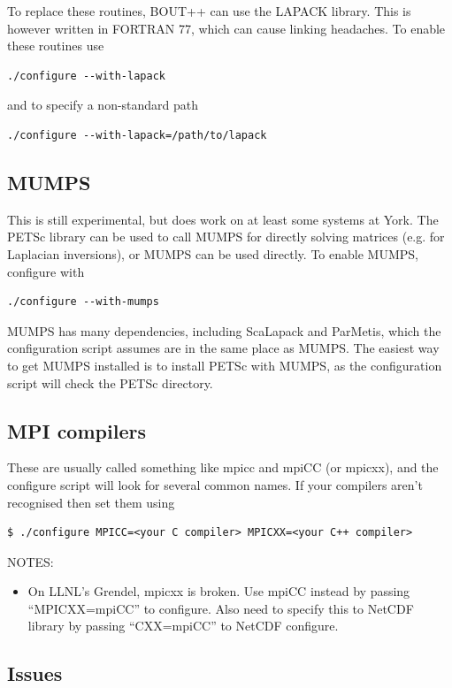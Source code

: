 \documentclass[12pt]{article}
\begin{document}
To replace these routines, BOUT++ can use the LAPACK library. This is however
written in FORTRAN 77, which can cause linking headaches.  To enable these
routines use
%
\begin{verbatim}
./configure --with-lapack
\end{verbatim}
%
and to specify a non-standard path
%
\begin{verbatim}
./configure --with-lapack=/path/to/lapack
\end{verbatim}
%



\subsection{MUMPS}
%
This is still experimental, but does work on at least some systems at York.
The PETSc library can be used to call MUMPS for directly solving matrices (e.g.
for Laplacian inversions), or MUMPS can be used directly.  To enable MUMPS,
configure with
%
\begin{verbatim}
./configure --with-mumps
\end{verbatim}
%
MUMPS has many dependencies, including ScaLapack and ParMetis, which the
configuration script assumes are in the same place as MUMPS. The easiest way to
get MUMPS installed is to install PETSc with MUMPS, as the configuration script
will check the PETSc directory.



\subsection{MPI compilers}
%
These are usually called something like mpicc and mpiCC (or mpicxx), and the
configure script will look for several common names.  If your compilers aren't
recognised then set them using
%
\begin{verbatim}
$ ./configure MPICC=<your C compiler> MPICXX=<your C++ compiler>
\end{verbatim}
%
NOTES:
%
\begin{itemize}
\item On LLNL's Grendel, mpicxx is broken. Use mpiCC instead by passing
    ``MPICXX=mpiCC'' to configure. Also need to specify this to NetCDF library
    by passing ``CXX=mpiCC'' to NetCDF configure.
\end{itemize}
%



\subsection{Issues}
%
\end{document}

